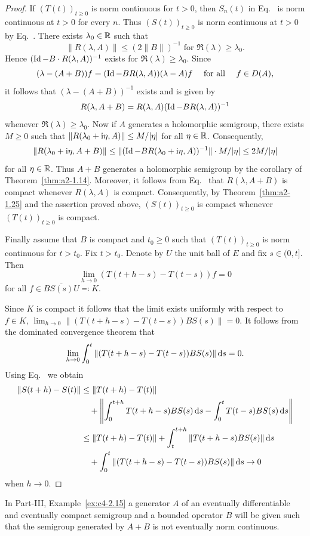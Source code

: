 \begin{proof}
If\/ $(T(t))_{t \geq 0}$ is norm continuous for $t > 0$, then $S_{n}(t)$ in Eq.~ is norm continuous at $t > 0$ for every $n$.
Thus $(S(t))_{t \geq 0}$ is norm continuous at $t > 0$ by Eq.~.
There exists $\lambda_{0} \in \mathbb{R}$ such that 
%
\[
	\|R(\lambda,A)\| \leq (2\|B\|)^{-1} \text{ for } \Re(\lambda) \geq \lambda_{0} .
\]
%
Hence $(\operatorname{Id} - B \cdot R(\lambda,A))^{-1}$ exists for $\Re(\lambda) \geq \lambda_{0}$.
Since 
\[
(\lambda -(A+B))f = (\operatorname{Id} - BR(\lambda,A))(\lambda - A)f  \quad \text{ for all } \quad f \in D(A),
\]
it follows that $(\lambda-(A+B))^{-1}$ exists and is given by
\begin{equation}\label{eq:a2-1.12}
    R(\lambda,A+B) = R(\lambda,A)(\operatorname{Id}-BR(\lambda,A))^{-1}
\end{equation}
whenever $\Re(\lambda) \geq \lambda_{0}$.
Now if\/ $A$ generates a holomorphic semigroup, there exists $M \geq 0$ such that $\|R(\lambda_{0}+\im\eta,A)\| \leq M/|\eta|$ for all $\eta \in \mathbb{R}$.
Consequently, 
\[
\|R(\lambda_{0}+\im\eta,A+B)\| \leq \|(\Id-BR(\lambda_{0} + \iu \eta,A))^{-1}\| \cdot M/|\eta| \leq 2M/|\eta|
\]
for all $\eta \in \mathbb{R}$.
Thus $A + B$ generates a holomorphic semigroup by the corollary of Theorem~\ref{thm:a2-1.14}.
Moreover, it follows from Eq.~  that $R(\lambda,A+B)$ is compact whenever $R(\lambda,A)$  is compact.
Consequently, by Theorem~\ref{thm:a2-1.25} and the  assertion proved above, $(S(t))_{t \geq 0}$ is compact whenever $(T(t))_{t \geq 0}$ is compact.

Finally assume that $B$ is compact and $t_{0} \geq 0$ such that $(T(t))_{t \geq 0}$ 
is norm continuous for $t > t_{0}$.
Fix $t > t_{0}$.
Denote by $U$ the unit ball of\/ $E$ and fix $s \in (0,t]$.
Then
\[
    \lim_{h \to 0} (T(t+h-s) - T(t-s))f = 0
\]
for all $f \in \overline{BS(s)U} \eqqcolon K$.

Since $K$ is compact it follows that the limit exists uniformly with respect to $f \in K$, \ie  
$\lim_{h \to 0} \|(T(t+h-s) - T(t-s))BS(s)\| = 0$.
It follows from the dominated convergence theorem that
\begin{equation}\label{eq:a2-1.13}
    \lim_{h \to 0} \int_{0}^{t} \|(T(t+h-s) - T(t-s))BS(s)\|\mathop{}\!\mathrm{d}{s} = 0.
\end{equation}
Using  Eq.~  we obtain 
\begin{align*}
	\|S(t+h) - S(t)\| &\leq \|T(t+h) - T(t)\| \\
	&\quad +  \left\| \int_{0}^{t+h} T(t+h-s)BS(s)\ds 
	-  \int_{0}^{t} T(t-s)BS(s)\ds \right\| \\
	&\leq \|T(t+h) - T(t)\| + \int_{t}^{t+h} \|T(t+h-s)BS(s)\| \ds \\ 
	&\quad + \int_{0}^{t} \|(T(t+h-s) - T(t-s))BS(s)\|\ds \to 0 
\end{align*}
when  $h \to 0$. 	
\end{proof}
In Part-III, Example~\ref{ex:c4-2.15} a generator $A$ of an eventually differentiable and eventually compact semigroup and a bounded operator $B$ will be given such that the semigroup generated by $A+B$ is not eventually norm continuous.

